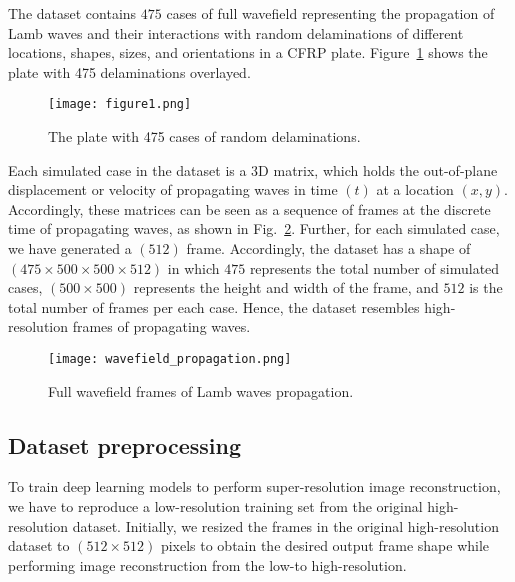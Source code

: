 The dataset contains \(475\) cases of full wavefield representing the propagation of Lamb waves and their interactions with random delaminations of different locations, shapes, sizes, and orientations in a CFRP plate.
Figure~\ref{fig:All_cases} shows the plate with 475 delaminations overlayed.
\begin{figure} [!ht]
	\begin{center}
		\texttt{[image: figure1.png]}
	\end{center}
	\caption{The plate with 475 cases of random delaminations.} 
	\label{fig:All_cases}
\end{figure}

Each simulated case in the dataset is a 3D matrix, which holds the out-of-plane displacement or velocity of propagating waves in time \((t)\) at a location \((x,y)\). 
Accordingly, these matrices can be seen as a sequence of frames at the discrete time of propagating waves, as shown in Fig.~\ref{fig:wavefield_propagation}. 
Further, for each simulated case, we have generated a \((512)\) frame.
Accordingly, the dataset has a shape of \((475\times500\times500\times512)\) in which \(475\) represents the total number of simulated cases, \((500\times500)\) represents the height and width of the frame, and \(512\) is the total number of frames per each case.
Hence, the dataset resembles high-resolution frames of propagating waves.
\begin{figure}[!ht]
	\begin{center}
		\texttt{[image: wavefield\_propagation.png]}
	\end{center}
	\caption{Full wavefield frames of Lamb waves propagation.} 
	\label{fig:wavefield_propagation}
\end{figure}
\subsection{Dataset preprocessing}
To train deep learning models to perform super-resolution image reconstruction, we have to reproduce a low-resolution training set from the original high-resolution dataset. 
Initially, we resized the frames in the original high-resolution dataset to \((512\times512)\) pixels to obtain the desired output frame shape while performing image reconstruction from the low-to high-resolution.


